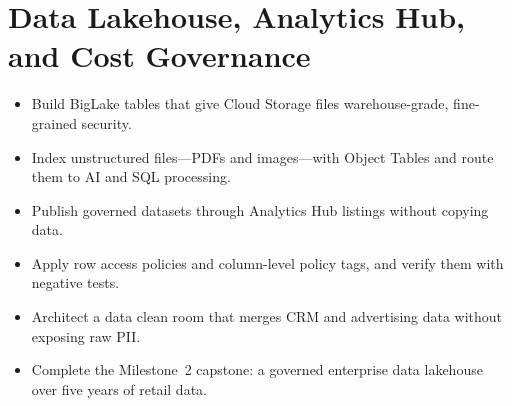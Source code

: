 \chapter{Data Lakehouse, Analytics Hub, and Cost Governance}

\begin{objectives}
\begin{itemize}
    \item Build BigLake tables that give Cloud Storage files warehouse-grade, fine-grained security.
    \item Index unstructured files---PDFs and images---with Object Tables and route them to AI and SQL processing.
    \item Publish governed datasets through Analytics Hub listings without copying data.
    \item Apply row access policies and column-level policy tags, and verify them with negative tests.
    \item Architect a data clean room that merges CRM and advertising data without exposing raw PII.
    \item Complete the Milestone~2 capstone: a governed enterprise data lakehouse over five years of retail data.
\end{itemize}
\end{objectives}

